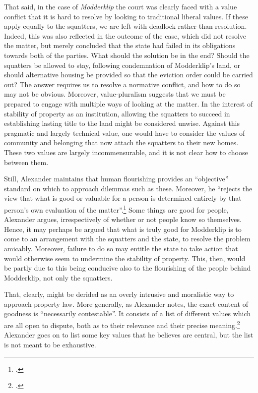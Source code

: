 That said, in the case of {\it Modderklip} the court was clearly faced with a value conflict that it is hard to resolve by looking to traditional liberal values. If these apply equally to the squatters, we are left with deadlock rather than resolution. Indeed, this was also reflected in the outcome of the case, which did not resolve the matter, but merely concluded that the state had failed in its obligations towards both of the parties. What should the solution be in the end? Should the squatters be allowed to stay, following condemnation of Modderklip's land, or should alternative housing be provided so that the eviction order could be carried out? The answer requires us to resolve a normative conflict, and how to do so may not be obvious. Moreover, value-pluralism suggests that we must be prepared to engage with multiple ways of looking at the matter. In the interest of stability of property as an institution, allowing the squatters to succeed in establishing lasting title to the land might be considered unwise. Against this pragmatic and largely technical value, one would have to consider the values of community and belonging that now attach the squatters to their new homes. These two values are largely incommensurable, and it is not clear how to choose between them.

Still, Alexander maintains that human flourishing provides an ``objective'' standard on which to approach dilemmas such as these. Moreover, he ``rejects the view that what is good or valuable for a person is determined entirely by that person's own evaluation of the matter''.\footcite[1263]{alexander14} Some things are good for people, Alexander argues, irrespectively of whether or not people know so themselves. Hence, it may perhaps be argued that what is truly good for Modderklip is to come to an arrangement with the squatters and the state, to resolve the problem amicably. Moreover, failure to do so may entitle the state to take action that would otherwise seem to undermine the stability of property. This, then, would be partly due to this being conducive also to the flourishing of the people behind Modderklip, not only the squatters.

That, clearly, might be derided as an overly intrusive and moralistic way to approach property law. More generally, as Alexander notes, the exact content of goodness is ``necessarily contestable''. It consists of a list of different values which are all open to dispute, both as to their relevance and their precise meaning.\footcite[1263]{alexander14} Alexander goes on to list some key values that he believes are central, but the list is not meant to be exhaustive. 

